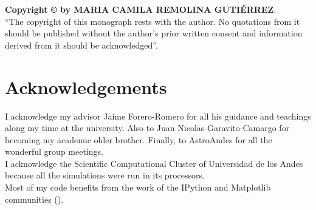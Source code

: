 \vspace{4in}
\noindent \textbf{Copyright \copyright{} by MARIA CAMILA REMOLINA GUTI\'ERREZ}.\\
``The copyright of this monograph rests with the author.  No quotations
from it should be published without the author's prior written consent
and information derived from it should be acknowledged''.

\chapter*{Acknowledgements}
I acknowledge my advisor Jaime Forero-Romero for all his guidance and teachings along my time at the university. Also to Juan Nicolas Garavito-Camargo for becoming my academic older brother. Finally, to AstroAndes for all the wonderful group meetings. \\

I acknowledge the Scientific Computational Cluster of Universidad de los Andes because all the simulations were run in its processors.\\

Most of my code benefits from the work of the IPython and Matplotlib communities (\cite{IPython,matplotlib}).\\

\tableofcontents
\clearpage
